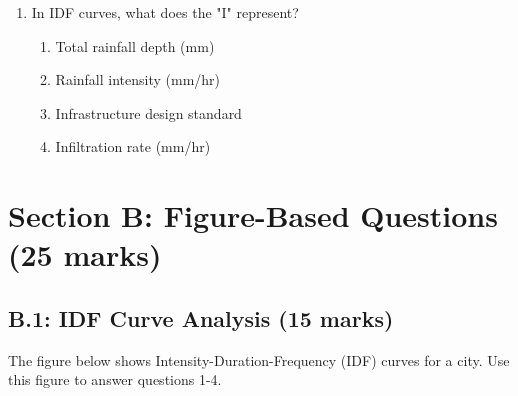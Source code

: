 \documentclass[11pt,a4paper]{article}
\begin{document}
\begin{enumerate}
\item In IDF curves, what does the "I" represent?
\begin{enumerate}[label=\Alph*)]
    \item Total rainfall depth (mm)
    \item Rainfall intensity (mm/hr)
    \item Infrastructure design standard
    \item Infiltration rate (mm/hr)
\end{enumerate}

\end{enumerate}

\newpage

\section*{Section B: Figure-Based Questions (25 marks)}

\subsection*{B.1: IDF Curve Analysis (15 marks)}

The figure below shows Intensity-Duration-Frequency (IDF) curves for a city. Use this figure to answer questions 1-4.
\end{document}

